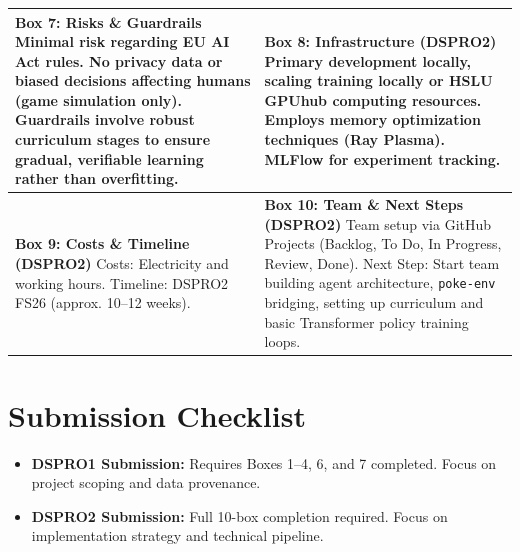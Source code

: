 \documentclass[11pt, a4paper]{article}
\begin{document}
\begin{table}[h!]
\begin{tabularx}{\textwidth}{|X|X|}
        \textbf{Box 7: Risks \& Guardrails} \newline 
        Minimal risk regarding EU AI Act rules. No privacy data or biased decisions affecting humans (game simulation only). Guardrails involve robust curriculum stages to ensure gradual, verifiable learning rather than overfitting. & 
        \textbf{Box 8: Infrastructure (DSPRO2)} \newline 
        Primary development locally, scaling training locally or HSLU GPUhub computing resources. Employs memory optimization techniques (Ray Plasma). MLFlow for experiment tracking. \\ \hline
        
        \textbf{Box 9: Costs \& Timeline (DSPRO2)} \newline 
        Costs: Electricity and working hours. \newline Timeline: DSPRO2 FS26 (approx. 10--12 weeks). & 
        \textbf{Box 10: Team \& Next Steps (DSPRO2)} \newline 
        Team setup via GitHub Projects (Backlog, To Do, In Progress, Review, Done). Next Step: Start team building agent architecture, \texttt{poke-env} bridging, setting up curriculum and basic Transformer policy training loops. \\ \hline
    \end{tabularx}
\end{table}

\section*{Submission Checklist}
\begin{itemize}
    \item \textbf{DSPRO1 Submission:} Requires Boxes 1--4, 6, and 7 completed. Focus on project scoping and data provenance.
    \item \textbf{DSPRO2 Submission:} Full 10-box completion required. Focus on implementation strategy and technical pipeline.
\end{itemize}
\end{document}
